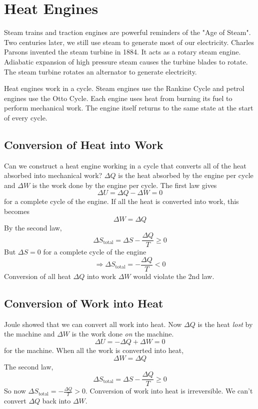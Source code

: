 \documentclass[british]{article}
\begin{document}
\section{Heat Engines}
Steam trains and traction engines are powerful reminders of the "Age of Steam". Two centuries later, we still use steam to generate most of our electricity. Charles Parsons invented the steam turbine in 1884. It acts as a rotary steam engine. Adiabatic expansion of high pressure steam causes the turbine blades to rotate. The steam turbine rotates an alternator to generate electricity.

Heat engines work in a cycle. Steam engines use the Rankine Cycle and petrol engines use the Otto Cycle. Each engine uses heat from burning its fuel to perform mechanical work. The engine itself returns to the same state at the start of every cycle.

\subsection{Conversion of Heat into Work}
Can we construct a heat engine working in a cycle that converts all of the heat absorbed into mechanical work? $\Delta Q$ is the heat absorbed by the engine per cycle and $\Delta W$ is the work done by the engine per cycle. The first law gives
\[
	\Delta U = \Delta Q - \Delta W =0
\]
for a complete cycle of the engine. If all the heat is converted into work, this becomes
\[
	\Delta W = \Delta Q
\]
By the second law,
\[
	\Delta S_\text{total} = \Delta S - \frac{\Delta Q}{T} \ge 0
\]
But $\Delta S =0$ for a complete cycle of the engine
\[
	\Rightarrow \Delta S_\text{total} = -\frac{\Delta Q}{T} < 0
\]
Conversion of all heat $\Delta Q$ into work $\Delta W$ would violate the 2nd law.

\subsection{Conversion of Work into Heat}
Joule showed that we can convert all work into heat. Now $\Delta Q$ is the heat \emph{lost} by the machine and $\Delta W$ is the work done \emph{on} the machine.
\[
	\Delta U = -\Delta Q + \Delta W =0
\]
for the machine. When all the work is converted into heat,
\[
	\Delta W = \Delta Q
\]
The second law,
\[
	\Delta S_\text{total} = \Delta S - \frac{\Delta Q}{T} \ge 0
\]
So now $\Delta S_\text{total} = -\frac{\Delta Q}{T} > 0$. Conversion of work into heat is irreversible. We can't convert $\Delta Q$ back into $\Delta W$. 
\end{document}
